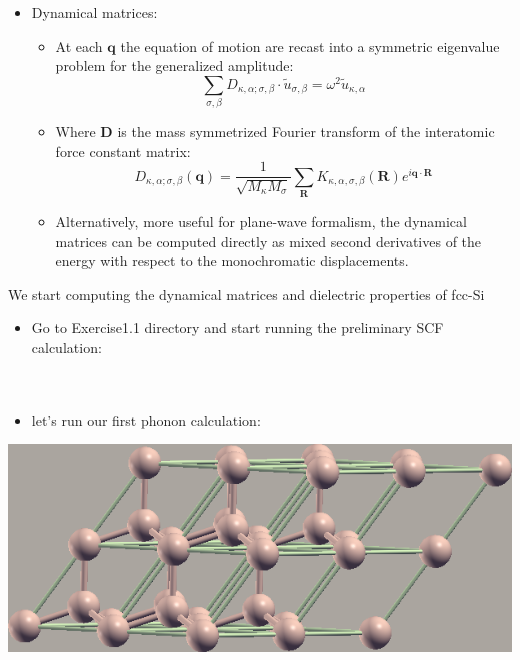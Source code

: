 \documentclass[landscape]{foils}
\begin{document}
\begin{itemize} 
		\item Dynamical matrices: 
\begin{itemize}
    \item At each $\mathbf{q}$  the equation of motion  are recast into a symmetric eigenvalue  problem for the generalized amplitude:   
	    $$ \sum_{\sigma,\beta}{D_{\kappa,\alpha;\sigma,\beta} \cdot \tilde{u}_{\sigma,\beta}} = \omega^2 \tilde{u}_{\kappa,\alpha} $$ 
    \item Where $\mathbf{D}$ is the mass symmetrized Fourier transform of the interatomic force constant matrix: 
	    $$ D_{\kappa,\alpha;\sigma,\beta}(\mathbf{q}) = \frac{1}{\sqrt{M_{\kappa}M_{\sigma}}} \sum_{\mathbf{R}}
		{K_{\kappa,\alpha,\sigma,\beta}(\mathbf{R}) e^{i \mathbf{q}\cdot{\mathbf{R}}}}$$ 
    \item Alternatively, more useful for plane-wave formalism,  the  dynamical matrices can be computed directly as mixed second derivatives of the energy with respect to 
	    the monochromatic displacements.   
\end{itemize}
\end{itemize}
We start computing the dynamical matrices and dielectric properties of fcc-Si
\begin{itemize} 
  \item Go to Exercise1.1 directory and start running the preliminary SCF calculation:\\[0.5em] 
	  \\
	  \\
  \item let's run our first phonon calculation:\\[0.5em]
\end{itemize}
\vspace{1em}
\begin{center}
	\includegraphics[width=14cm]{../pictures/fcc-Si.png}
\end{center}
\end{document}
